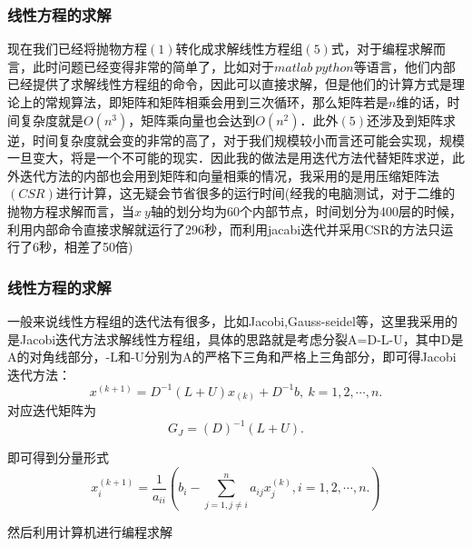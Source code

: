\documentclass[UTF8]{beamer}
\begin{document}
\begin{frame}[t]\frametitle{线性方程的求解}

现在我们已经将抛物方程$(1)$转化成求解线性方程组$(5)$式，对于编程求解而言，此时问题已经变得非常的简单了，比如对于$matlab~python$等语言，他们内部已经提供了求解线性方程组的命令，因此可以直接求解，但是他们的计算方式是理论上的常规算法，即矩阵和矩阵相乘会用到三次循环，那么矩阵若是$n$维的话，时间复杂度就是$O(n^3)$，矩阵乘向量也会达到$O(n^2)$．此外$(5)$还涉及到矩阵求逆，时间复杂度就会变的非常的高了，对于我们规模较小而言还可能会实现，规模一旦变大，将是一个不可能的现实．因此我的做法是用迭代方法代替矩阵求逆，此外迭代方法的内部也会用到矩阵和向量相乘的情况，我采用的是用压缩矩阵法$(CSR)$进行计算，这无疑会节省很多的运行时间(经我的电脑测试，对于二维的抛物方程求解而言，当$x~y$轴的划分均为60个内部节点，时间划分为400层的时候，利用内部命令直接求解就运行了296秒，而利用jacabi迭代并采用CSR的方法只运行了6秒，相差了50倍)

\end{frame}

\begin{frame}[t]\frametitle{线性方程的求解}

一般来说线性方程组的迭代法有很多，比如Jacobi,Gauss-seidel等，这里我采用的是Jacobi迭代方法求解线性方程组，具体的思路就是考虑分裂A=D-L-U，其中D是A的对角线部分，-L和-U分别为A的严格下三角和严格上三角部分，即可得Jacobi迭代方法：
\begin{equation}
x^{(k+1)} = D^{-1}(L+U)x_{(k)}+D^{-1}b,~k=1,2,\cdots,n.
\end{equation}
对应迭代矩阵为
\begin{equation}
G_{J}=(D)^{-1}(L+U).
\end{equation}

即可得到分量形式
\begin{equation}
x^{(k+1)}_i = \frac{1}{a_{ii}}\left(b_i-\sum^{n}_{j=1,j\neq i}a_{ij}x^{(k)}_j ,i=1,2,\cdots,n. \right)
\end{equation}

然后利用计算机进行编程求解

\end{frame}
\end{document}

